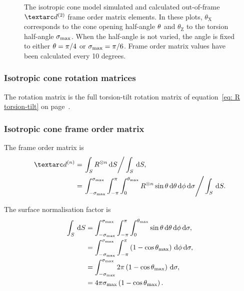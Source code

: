 \begin{figure}
\begin{tabular}{@{}cc@{}}
  \end{tabular}
  \caption[Isotropic cone simulated and calculated out-of-frame $\FOtwo$ elements.]{
    The isotropic cone model simulated and calculated out-of-frame $\FOtwo$ frame order matrix elements.
    In these plots, $\theta_\textrm{X}$ corresponds to the cone opening half-angle $\theta$ and $\theta_\textrm{Z}$ to the torsion half-angle $\sigma_\textrm{max}$.
    When the half-angle is not varied, the angle is fixed to either $\theta = \pi/4$ or $\sigma_\textrm{max} = \pi/6$.
    Frame order matrix values have been calculated every 10 degrees.
  }
  \label{fig: simulated and calculated out-of-frame 2nd degree iso cone frame order}
\end{figure}


\subsubsection{Isotropic cone rotation matrices}

The rotation matrix is the full torsion-tilt rotation matrix of equation~\ref{eq: R torsion-tilt} on page~\pageref{eq: R torsion-tilt}.


\subsubsection{Isotropic cone frame order matrix}


The frame order matrix is
\begin{subequations}
\begin{align}
    \FOn &= \left. \int_S R^{\otimes n} \diff S \right / \int_S \diff S , \\
         &= \left. \int_{-\conesmax}^{\conesmax} \int_{-\pi}^{\pi} \int_{0}^{\conethetamax} R^{\otimes n} \sin\theta \diff\theta \diff\phi \diff\sigma  \right / \int_S \diff S .
\end{align}
\end{subequations}

The surface normalisation factor is
\begin{subequations}
\begin{align}
    \int_S \,\mathrm{d} S &= \int_{-\sigma_\textrm{max}}^{\sigma_\textrm{max}} \int_{-\pi}^{\pi} \int_{0}^{\theta_\textrm{max}} \sin\theta \,\mathrm{d}\theta \,\mathrm{d}\phi \,\mathrm{d}\sigma , \\
                   &= \int_{-\sigma_\textrm{max}}^{\sigma_\textrm{max}} \int_{-\pi}^{\pi} \left( 1 - \cos\theta_\textrm{max} \right) \,\mathrm{d}\phi \,\mathrm{d}\sigma , \\
                   &= \int_{-\sigma_\textrm{max}}^{\sigma_\textrm{max}} 2\pi \left( 1 - \cos\theta_\textrm{max} \right) \,\mathrm{d}\sigma , \\
                   &= 4\pi \sigma_\textrm{max} \left( 1 - \cos\theta_\textrm{max} \right) .
\end{align}
\end{subequations}



